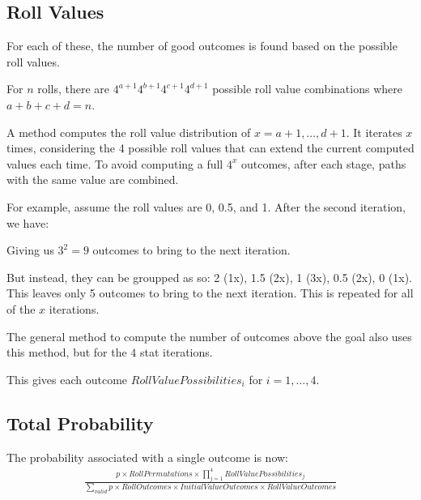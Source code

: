 \documentclass[12pt]{article}
\begin{document}
\subsection{Roll Values}

For each of these, the number of good outcomes is found based on the possible roll values.

For $n$ rolls, there are $4^{a+1}4^{b+1}4^{c+1}4^{d+1}$ possible roll value combinations where $a + b + c + d = n$.

A method computes the roll value distribution of $x = a+1, \dots, d+1$. It iterates $x$ times, considering the 4 possible roll values that can extend the current computed values each time. To avoid computing a full $4^x$ outcomes, after each stage, paths with the same value are combined.

For example, assume the roll values are 0, 0.5, and 1. After the second iteration, we have:


Giving us $3^2 = 9$ outcomes to bring to the next iteration.

But instead, they can be groupped as so: 2 (1x), 1.5 (2x), 1 (3x), 0.5 (2x), 0 (1x). This leaves only 5 outcomes to bring to the next iteration. This is repeated for all of the $x$ iterations.

The general method to compute the number of outcomes above the goal also uses this method, but for the $4$ stat iterations.

This gives each outcome $RollValuePossibilities_i$ for $i = 1, \dots, 4$.

\subsection{Total Probability}

The probability associated with a single outcome is now:
\begin{align*}
	\frac{p \times RollPermutations \times \prod_{j = 1}^{4} RollValuePossibilities_j}{\sum_{valid} p \times RollOutcomes \times InitialValueOutcomes \times RollValueOutcomes}
\end{align*}
\end{document}
